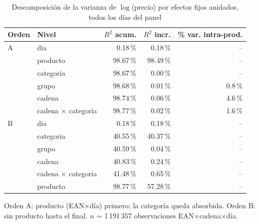 \begin{table}[htbp]
\caption{Descomposici\'on de la varianza de $\log$(precio) por efectos fijos anidados, todos los d\'ias del panel}
\label{tab:varianza}
\centering\scriptsize\setlength{\tabcolsep}{3pt}
\begin{tabular}{@{}llrrr@{}}
\toprule
Orden & Nivel & $R^2$ acum. & $R^2$ incr. & \% var. intra-prod. \\
\midrule
A & dia & 0.18\,\% & 0.18\,\% & -- \\
 & producto & 98.67\,\% & 98.49\,\% & -- \\
 & categoria & 98.67\,\% & 0.00\,\% & -- \\
 & grupo & 98.68\,\% & 0.01\,\% & 0.8\,\% \\
 & cadena & 98.74\,\% & 0.06\,\% & 4.6\,\% \\
 & cadena $\times$ categoria & 98.77\,\% & 0.02\,\% & 1.6\,\% \\
\midrule
B & dia & 0.18\,\% & 0.18\,\% & -- \\
 & categoria & 40.55\,\% & 40.37\,\% & -- \\
 & grupo & 40.59\,\% & 0.04\,\% & -- \\
 & cadena & 40.83\,\% & 0.24\,\% & -- \\
 & cadena $\times$ categoria & 41.48\,\% & 0.65\,\% & -- \\
 & producto & 98.77\,\% & 57.28\,\% & -- \\
\bottomrule\end{tabular}
\par\smallskip\raggedright\scriptsize Orden A: producto (EAN$\times$d\'ia) primero; la categor\'ia queda absorbida. Orden B: sin producto hasta el final. $n$ = 1\,191\,357 observaciones EAN$\times$cadena$\times$d\'ia.
\end{table}

